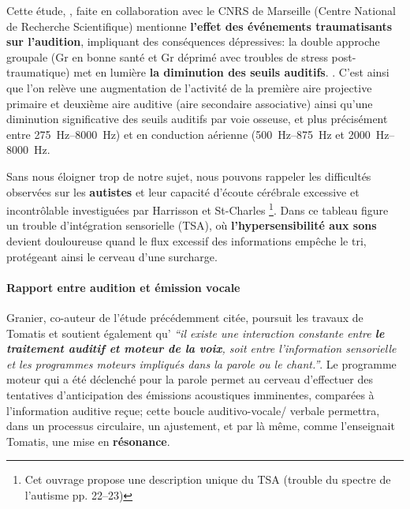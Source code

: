 Cette étude, \autocite{affectiveDisorders}, faite
   en collaboration avec
le CNRS de Marseille (Centre National de Recherche Scientifique)
 mentionne \textbf{l'effet des événements
traumatisants sur l'audition}, impliquant des conséquences dépressives:
la double approche groupale (Gr en bonne santé et Gr déprimé avec
troubles de stress post-traumatique) met en lumière \textbf{la diminution des
  seuils auditifs}. .%
C'est ainsi que l'on relève une augmentation de l'activité de la
première aire projective primaire et deuxième aire auditive (aire
secondaire associative) ainsi qu'une diminution significative des
seuils auditifs par voie osseuse, et plus précisément entre
\SIrange{275}{8000}{\Hz}) et en conduction aérienne
(\SIrange{500}{875}{\Hz} et  \SIrange{2000}{8000}{\Hz}.

Sans nous éloigner trop de notre sujet, nous pouvons rappeler
les difficultés observées sur les
\textbf{autistes} et leur capacité d'écoute cérébrale excessive et
incontrôlable investiguées par Harrisson et St-Charles \autocite {harrisson_autisme_2017}\footnote{Cet ouvrage propose une description unique du TSA
   (trouble du spectre de l'autisme
   pp. 22--23)}. Dans ce tableau
 figure un trouble d'intégration sensorielle (TSA), où
 \textbf{l'hypersensibilité aux sons} devient douloureuse quand le flux excessif
 des
 informations empêche le tri, protégeant ainsi le cerveau d'une surcharge.

\paragraph{Rapport entre audition et émission vocale}


Granier, co-auteur de l'étude \autocite{affectiveDisorders} précédemment citée, poursuit les travaux de Tomatis et soutient également qu'\textit{ ``il existe une
interaction
constante entre  \textbf{le traitement auditif et moteur de la
voix}, soit entre l'information sensorielle et les programmes moteurs impliqués
dans la parole ou le chant.''}.
Le programme moteur qui a été déclenché
pour la parole permet au cerveau d'effectuer des tentatives d'anticipation
des émissions acoustiques imminentes, comparées à l'information
auditive reçue; cette boucle
auditivo-vocale/ verbale permettra, dans un processus circulaire, un ajustement,
et par là même, comme l'enseignait Tomatis, une mise en \textbf{résonance}.

